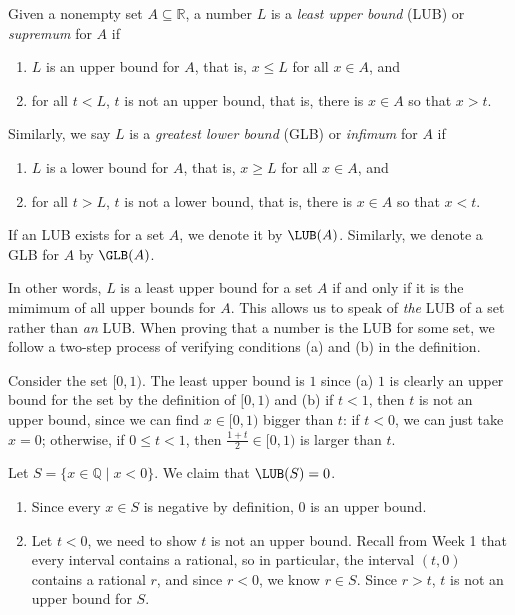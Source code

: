 \documentclass[11pt,dvipsnames]{book}
\numberwithin{figure}{section} %
\numberwithin{table}{section} %
\begin{document}
\begin{definition}
Given a nonempty set $A\subseteq \mathbb{R}$, a number $L$ is a {\it least upper bound} (LUB) or {\it supremum} for $A$ if
\begin{enumerate}[label=(\alph*)]
\item $L$ is an upper bound for $A$, that is, $x\leq L$ for all $x\in A$, and
\item for all $t<L$, $t$ is not an upper bound, that is, there is $x\in A$ so that $x>t$.
\end{enumerate}
Similarly, we say $L$ is a {\it greatest lower bound} (GLB) or {\it infimum} for $A$ if
\begin{enumerate}[label=(\alph*)]
\item $L$ is a lower bound for $A$, that is, $x\geq L$ for all $x\in A$, and
\item for all $t>L$, $t$ is not a lower bound, that is, there is $x\in A$ so that $x<t$.
\end{enumerate}
If an LUB exists for a set $A$, we denote it by $\LUB(A)$. Similarly, we denote a GLB for $A$ by $\GLB(A)$.
\end{definition}

In other words, $L$ is a least upper bound for a set $A$ if and only if it is the mimimum of all upper bounds for $A$. This allows us to speak of \emph{the} LUB of a set rather than \emph{an} LUB. When proving that a number is the LUB for some set, we follow a two-step process of verifying conditions (a) and (b) in the definition.

\begin{example}
Consider the set $[0,1)$. The least upper bound is $1$ since (a) $1$ is clearly an upper bound for the set by the definition of $[0,1)$ and (b) if $t<1$, then $t$ is not an upper bound, since we can find $x\in [0,1)$ bigger than $t$: if $t<0$, we can just take $x=0$; otherwise, if $0\leq t<1$, then $\frac{1+t}{2}\in [0,1)$ is larger than $t$.
\end{example}

\begin{example}
Let $S=\{x\in\mathbb{Q} \; | \; x<0\}$. We claim that $\LUB(S)=0$.

\begin{enumerate}[label=(\alph*)]
\item Since every $x\in S$ is negative by definition, $0$ is an upper bound.
\item Let $t<0$, we need to show $t$ is not an upper bound. Recall from Week 1 that every interval contains a rational, so in particular, the interval $(t,0)$ contains a rational $r$, and since $r<0$, we know $r\in S$. Since $r>t$, $t$ is not an upper bound for $S$.
\end{enumerate}
\end{example}
\end{document}
